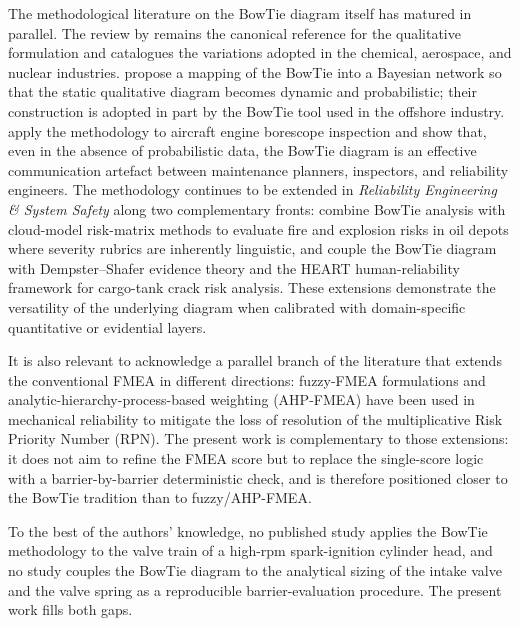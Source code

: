 The methodological literature on the BowTie diagram itself has
matured in parallel. The review by \citet{deruijter2016bowtiereview}
remains the canonical reference for the qualitative formulation and
catalogues the variations adopted in the chemical, aerospace, and
nuclear industries. \citet{khakzad2013bowtiebayesian} propose a mapping
of the BowTie into a Bayesian network so that the static qualitative
diagram becomes dynamic and probabilistic; their construction is
adopted in part by the BowTie tool used in the offshore industry.
\citet{aust2019bowtieaircraft} apply the methodology to aircraft engine
borescope inspection and show that, even in the absence of
probabilistic data, the BowTie diagram is an effective communication
artefact between maintenance planners, inspectors, and reliability
engineers. The methodology continues to be extended in
\textit{Reliability Engineering \& System Safety} along two
complementary fronts:
\citet{xie2021ressbowtie} combine BowTie analysis with cloud-model
risk-matrix methods to evaluate fire and explosion risks in oil depots
where severity rubrics are inherently linguistic, and
\citet{sezer2023ressbowtie} couple the BowTie diagram with
Dempster--Shafer evidence theory and the HEART human-reliability
framework for cargo-tank crack risk analysis. These extensions
demonstrate the versatility of the underlying diagram when calibrated
with domain-specific quantitative or evidential layers.

It is also relevant to acknowledge a parallel branch of the literature
that extends the conventional FMEA in different directions: fuzzy-FMEA
formulations and analytic-hierarchy-process-based weighting (AHP-FMEA)
have been used in mechanical reliability to mitigate the loss of
resolution of the multiplicative Risk Priority Number (RPN). The
present work is complementary to those extensions: it does not aim
to refine the FMEA score but to replace the single-score logic with
a barrier-by-barrier deterministic check, and is therefore
positioned closer to the BowTie tradition than to fuzzy/AHP-FMEA.

To the best of the authors' knowledge, no published study applies the
BowTie methodology to the valve train of a high-rpm spark-ignition
cylinder head, and no study couples the BowTie diagram to the
analytical sizing of the intake valve and the valve spring as a
reproducible barrier-evaluation procedure. The present work fills both
gaps.
